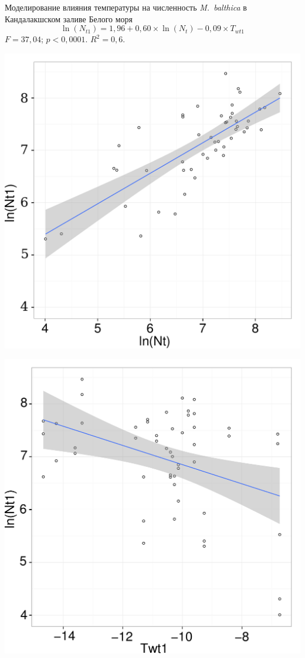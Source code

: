 \documentclass{beamer}
\begin{document}
\begin{frame}{Моделирование влияния температуры на численность {\it M.~balthica} в Кандалакшском заливе Белого моря}
$$\ln(N_{t1}) = 1,96 + 0,60 \times \ln(N_{t}) - 0,09 \times T_{wt1}$$
{\scriptsize $F = 37,04$; $p < 0,0001$. $R^2 = 0,6$.} \\
	\begin{minipage}[t]{.49\linewidth}
		\begin{center}
			\includegraphics[width=\textwidth]{./lodNt_vs_logNt1_2.pdf}
		\end{center}
	\end{minipage}
%
	\begin{minipage}[t]{.49\linewidth}
		\begin{center}
			\includegraphics[width=\textwidth]{./Twt1_vs_logNt1_2.pdf}

\end{center}
\end{minipage}
\end{frame}
\end{document}
